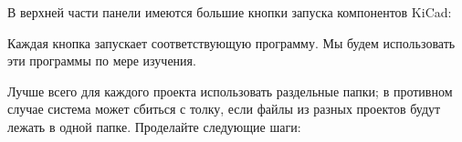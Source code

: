 
В верхней части панели  
имеются большие кнопки запуска компонентов KiCad:


Каждая кнопка запускает соответствующую программу. Мы будем использовать эти
программы по мере изучения.

\bigskip
Лучше всего для каждого проекта использовать раздельные папки; в противном
случае система может сбиться с толку, если файлы из разных проектов будут лежать
в одной папке. Проделайте следующие шаги:

